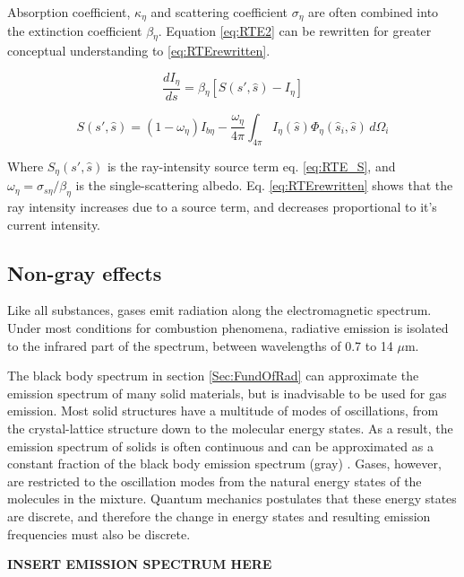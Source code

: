 Absorption coefficient, $\kappa_{\eta{}}$ and scattering coefficient $\sigma{}_\eta{}$ are often combined into the extinction coefficient $\beta{}_\eta{}$. Equation \ref{eq:RTE2} can be rewritten for greater conceptual understanding to \ref{eq:RTErewritten}.

\begin{equation}
    \frac{dI_\eta{}}{ds} = \beta{}_\eta{}[S(s',\hat{s})-I_\eta{}]
    \label{eq:RTErewritten}
\end{equation}

\begin{equation}
    S(s',\hat{s}) = (1-\omega{}_\eta{})I_{b\eta{}}-\frac{\omega{}_\eta{}}{4\pi}\int_{4\pi{}}{I_\eta{}(\hat{s})\Phi_\eta{}(\hat{s}_i,\hat{s})}\,d\Omega{}_i
    \label{eq:RTE_S}
\end{equation}

Where $S_\eta{}(s',\hat{s})$ is the ray-intensity source term eq. \ref{eq:RTE_S}, and $\omega{}_\eta{}=\sigma{}_{s\eta{}}/\beta_{\eta{}}$ is the single-scattering albedo. Eq. \ref{eq:RTErewritten} shows that the ray intensity increases due to a source term, and decreases proportional to it's current intensity.

\subsection{Non-gray effects}\label{Sec:Nongray}
Like all substances, gases emit radiation along the electromagnetic spectrum. Under most conditions for combustion phenomena, radiative emission is isolated to the infrared part of the spectrum, between wavelengths of 0.7 to 14 $\mu{}$m.

The black body spectrum in section \ref{Sec:FundOfRad} can approximate the emission spectrum of many solid materials, but is inadvisable to be used for gas emission. 
Most solid structures have a multitude of modes of oscillations, from the crystal-lattice structure down to the molecular energy states. As a result, the emission spectrum of solids is often continuous and can be approximated as a constant fraction of the black body emission spectrum (gray) \cite{Howell2010ThermalTransfer}. 
Gases, however, are restricted to the oscillation modes from the natural energy states of the molecules in the mixture. Quantum mechanics postulates that these energy states are discrete, and therefore the change in energy states and resulting emission frequencies must also be discrete.


\textbf{INSERT EMISSION SPECTRUM HERE}

